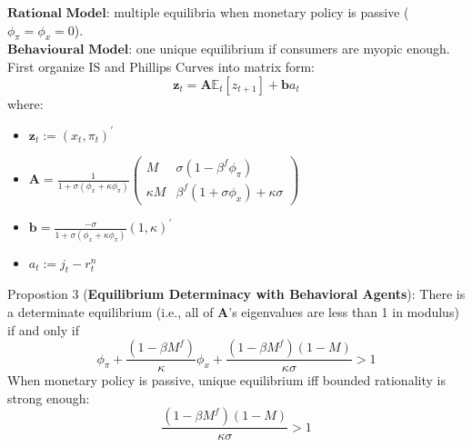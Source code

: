 \documentclass{beamer}
\begin{document}
\begin{frame}{\subsecname}
    $\textbf{Rational Model}$: multiple equilibria when monetary policy is passive ($\phi_{\pi}=\phi_{x}=0$).\\
    $\textbf{Behavioural Model}$: one unique equilibrium if consumers are myopic enough.\\
    First organize IS and Phillips Curves into matrix form:\\ 
    \begin{equation}\tag{32}                                     \textbf{z}_{t}=\textbf{A}\mathbb{E}_{t}\left[z_{t+1}\right]+\textbf{b}a_{t}
    \end{equation}
    where:
    \begin{itemize}
        \item $\textbf{z}_{t}:=(x_{t},\pi_{t})^{\prime}$
        \item $\textbf{A}=\frac{1}{1+\sigma(\phi_{x}+\kappa\phi_{\pi})}\begin{pmatrix} M & \sigma(1-\beta^{f}\phi_{\pi}) \\ \kappa M & \beta^{f}(1+\sigma\phi_{x})+\kappa\sigma \end{pmatrix}$
        \item $\textbf{b}=\frac{-\sigma}{1+\sigma(\phi_{x}+\kappa\phi_{\pi})}(1,\kappa)^{\prime}$
        \item $a_{t}:=j_{t}-r_{t}^{n}$
    \end{itemize}
\end{frame}

\begin{frame}{\subsecname}
    Propostion 3 (\textbf{Equilibrium Determinacy with Behavioral Agents}): There is a determinate equilibrium (i.e., all of $\textbf{A}$’s eigenvalues are less than 1 in modulus) if and only if
    \begin{equation}\tag{34}
        \phi_{\pi}+\frac{(1-\beta M^{f})}{\kappa}\phi_{x}+\frac{(1-\beta M^{f})(1-M)}{\kappa\sigma}>1
    \end{equation}
    When monetary policy is passive, unique equilibrium iff bounded rationality is strong enough:
    \begin{equation}\tag{35}
        \frac{(1-\beta M^{f})(1-M)}{\kappa\sigma}>1
    \end{equation}
\end{frame}
\end{document}
